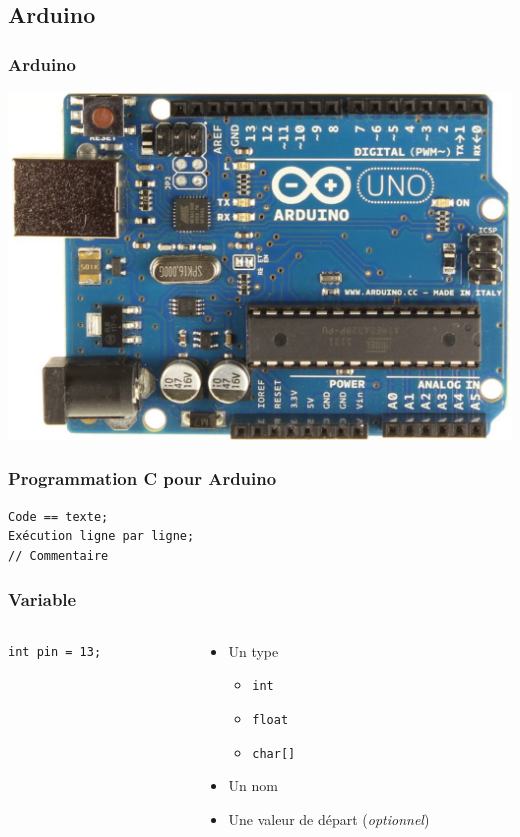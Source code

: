 \documentclass[aspectratio=169,utf8]{beamer}
\begin{document}
\subsection{Arduino}

\begin{frame}
  \frametitle{Arduino}
  \begin{center}
    \includegraphics[height=.8\textheight]{arduino.jpg}
  \end{center}
\end{frame}

\begin{frame}[fragile]
  \frametitle{Programmation C pour Arduino}
  \begin{lstlisting}
Code == texte;
Exécution ligne par ligne;
// Commentaire
  \end{lstlisting}
\end{frame}

\begin{frame}[fragile]
  \frametitle{Variable}
  \begin{columns}
    \begin{column}{.4\textwidth}
      \begin{lstlisting}
int pin = 13;
      \end{lstlisting}
    \end{column}
    \begin{column}{.6\textwidth}
      \begin{itemize}
        \item Un type
        \begin{itemize}
          \item \lstinline{int}
          \item \lstinline{float}
          \item \lstinline{char[]}
        \end{itemize}
        \item Un nom
        \item Une valeur de départ (\emph{optionnel})
      \end{itemize}
    \end{column}
  \end{columns}
\end{frame}
\end{document}
